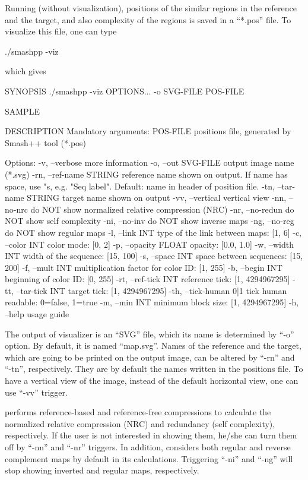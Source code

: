 Running \smashpp (without visualization), positions of the similar regions in the reference and the target, and also complexity of the regions is saved in a ``*.pos'' file. To visualize this file, one can type
\begin{code}[style=bash]
  ./smashpp -viz
\end{code}
which gives
\begin{code}[style=bash]
  SYNOPSIS
  ./smashpp -viz  OPTIONS...  -o SVG-FILE  POS-FILE

  SAMPLE

  DESCRIPTION
  Mandatory arguments:
  POS-FILE                 positions file, generated by
  Smash++ tool (*.pos)

  Options:
  -v,  --verbose           more information
  -o,  --out SVG-FILE      output image name (*.svg)
  -rn, --ref-name STRING   reference name shown on output. If name
  has space, use "s, e.g. "Seq label".
  Default: name in header of position file.
  -tn, --tar-name STRING   target name shown on output
  -vv, --vertical          vertical view
  -nn, --no-nrc            do NOT show normalized
  relative compression (NRC)
  -nr, --no-redun          do NOT show self complexity
  -ni, --no-inv            do NOT show inverse maps
  -ng, --no-reg            do NOT show regular maps
  -l,  --link     INT      type of the link between maps: [1, 6]
  -c,  --color    INT      color mode: [0, 2]
  -p,  --opacity  FLOAT    opacity: [0.0, 1.0]
  -w,  --width    INT      width of the sequence: [15, 100]
  -s,  --space    INT      space between sequences: [15, 200]
  -f,  --mult     INT      multiplication factor for
  color ID: [1, 255]
  -b,  --begin    INT      beginning of color ID: [0, 255]
  -rt, --ref-tick INT      reference tick: [1, 4294967295]
  -tt, --tar-tick INT      target tick: [1, 4294967295]
  -th, --tick-human 0|1    tick human readable: 0=false, 1=true
  -m,  --min      INT      minimum block size: [1, 4294967295]
  -h,  --help              usage guide
\end{code}

The output of \smashpp visualizer is an ``SVG'' file, which its name is determined by ``-o'' option. By default, it is named ``map.svg''. Names of the reference and the target, which are going to be printed on the output image, can be altered by ``-rn'' and ``-tn'', respectively. They are by default the names written in the positions file. To have a vertical view of the image, instead of the default horizontal view, one can use ``-vv'' trigger.

\smashpp performs reference-based and reference-free compressions to calculate the normalized relative compression (NRC) and redundancy (self complexity), respectively. If the user is not interested in showing them, he/she can turn them off by ``-nn'' and ``-nr'' triggers. In addition, \smashpp considers both regular and reverse complement maps by default in its calculations. Triggering ``-ni'' and ``-ng'' will stop showing inverted and regular maps, respectively.

